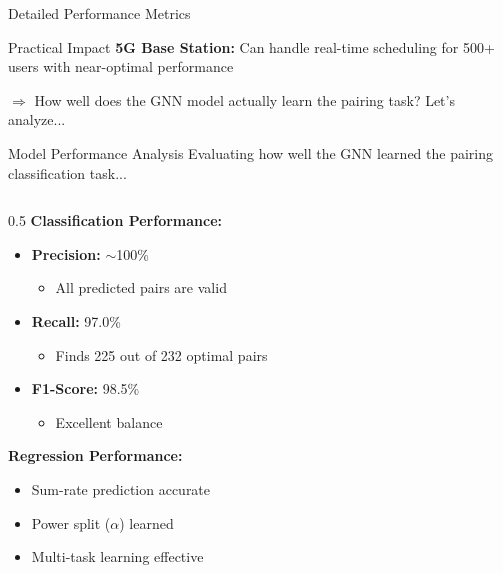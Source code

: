 \documentclass[aspectratio=169]{beamer}
\begin{document}
\begin{frame}{Detailed Performance Metrics}
    \vspace{-.3cm}
    \begin{exampleblock}{Practical Impact}
        \textbf{5G Base Station:} Can handle real-time scheduling for 500+ users with near-optimal performance
    \end{exampleblock}
    
    \small \textcolor{iiitblue}{$\Rightarrow$ How well does the GNN model actually learn the pairing task? Let's analyze...}
\end{frame}

\begin{frame}{Model Performance Analysis} 
    \vspace{-0.1cm}
    \small \textcolor{iiitblue}{Evaluating how well the GNN learned the pairing classification task...}
    \vspace{.1cm}
    \begin{columns}
        \begin{column}{0.5\textwidth}
            \textbf{Classification Performance:} \vspace{-.2cm}
            \begin{itemize}
                \item \textbf{Precision:} $\sim$100\%
                \begin{itemize}
                    \item All predicted pairs are valid
                \end{itemize}
                \item \textbf{Recall:} 97.0\%
                \begin{itemize}
                    \item Finds 225 out of 232 optimal pairs
                \end{itemize}
                \item \textbf{F1-Score:} 98.5\%
                \begin{itemize}
                    \item Excellent balance
                \end{itemize}
            \end{itemize}
            
            
            \vspace{-.2cm}
            \textbf{Regression Performance:}\vspace{-.2cm}
            \begin{itemize}
                \item Sum-rate prediction accurate
                \item Power split ($\alpha$) learned
                \item Multi-task learning effective
            \end{itemize}
        \end{column}
        

\end{columns}
\end{frame}
\end{document}
